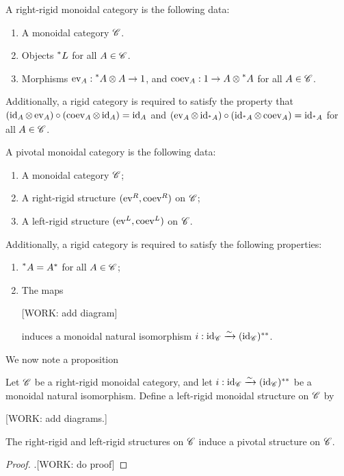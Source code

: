 \begin{definition} A right-rigid monoidal category is the following data:

\begin{enumerate}
\item A monoidal category $\mathscr{C}$.
\item Objects $\prescript{*}{} L$ for all $A\in \mathscr{C}$.
\item Morphisms $\operatorname{ev}_{A}: \prescript{*}{} A\otimes A\to 1$, and $\operatorname{coev}_{A}: 1\to A\otimes \prescript{*}{} A$ for all $A\in \mathscr{C}$.
\end{enumerate}

Additionally, a rigid category is required to satisfy the property that $(\operatorname{id}_A\otimes\operatorname{ev}_A)\circ (\operatorname{coev}_A\otimes \operatorname{id}_A)=\operatorname{id}_A$ and $(\operatorname{ev}_A\otimes \operatorname{id}_{\prescript{*}{} A})\circ (\operatorname{id}_{\prescript{*}{} A}\otimes \operatorname{coev}_{A})=\operatorname{id}_{\prescript{*}{} A}$ for all $A\in \mathscr{C}$. 

\raggedleft\qedsymbol{}
\end{definition}


\begin{definition} A pivotal monoidal category is the following data:

\begin{enumerate}
\item A monoidal category $\mathscr{C}$;
\item A right-rigid structure $(\operatorname{ev}^R, \operatorname{coev}^R)$ on $\mathscr{C}$;
\item A left-rigid structure $(\operatorname{ev}^L, \operatorname{coev}^L)$ on $\mathscr{C}$.
\end{enumerate}

Additionally, a rigid category is required to satisfy the following properties:

\begin{enumerate}
\item $\prescript{*}{} A = A^*$ for all $A\in \mathscr{C}$;
\item The maps

[WORK: add diagram]

induces a monoidal natural isomorphism $i:\operatorname{id}_{\mathscr{C}} \xrightarrow{\sim} (\operatorname{id}_{\mathscr{C}})^{**}$.
\end{enumerate}

\raggedleft\qedsymbol{}
\end{definition}

We now note a proposition

\begin{proposition} Let $\mathscr{C}$ be a right-rigid monoidal category, and let $i:\operatorname{id}_{\mathscr{C}} \xrightarrow{\sim} (\operatorname{id}_{\mathscr{C}})^{**}$ be a monoidal natural isomorphism. Define a left-rigid monoidal structure on $\mathscr{C}$ by

[WORK: add diagrams.]

The right-rigid and left-rigid structures on $\mathscr{C}$ induce a pivotal structure on $\mathscr{C}$.
\end{proposition}
\begin{proof}.[WORK: do proof]
\end{proof}

